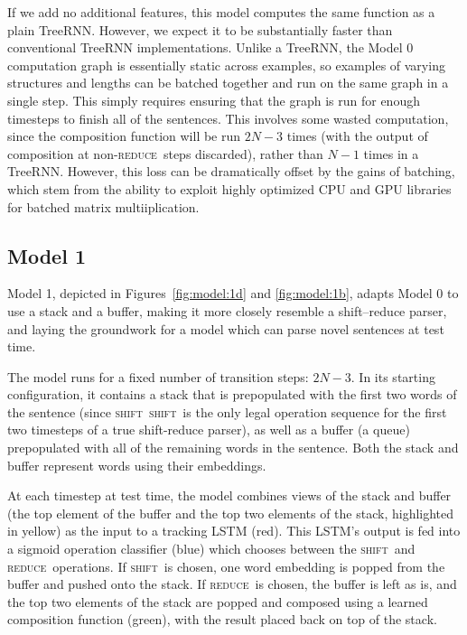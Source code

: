 \documentclass[11pt,letterpaper]{article}
\newcommand{\shift}{\textsc{shift}}
\newcommand{\reduce}{\textsc{reduce}}
\begin{document}
If we add no additional features, this model computes the same function as a plain TreeRNN. However, we expect it to be substantially faster than conventional TreeRNN implementations. Unlike a TreeRNN, the Model 0 computation graph is essentially static across examples, so examples of varying structures and lengths can be batched together and run on the same graph in a single step. This simply requires ensuring that the graph is run for enough timesteps to finish all of the sentences. This involves some wasted computation, since the composition function will be run $2N-3$ times (with the output of composition at non-\reduce~steps discarded), rather than $N-1$ times in a TreeRNN. However, this loss can be dramatically offset by the gains of batching, which stem from the ability to exploit highly optimized CPU and GPU libraries for batched matrix multiiplication.

\subsection{Model 1}



Model 1, depicted in Figures~\ref{fig:model:1d} and \ref{fig:model:1b}, adapts Model 0 to use a stack and a buffer, making it more closely resemble a shift--reduce parser, and laying the groundwork for a model which can parse novel sentences at test time.

The model runs for a fixed number of transition steps: $2N - 3$. In its starting configuration, it contains a stack that is prepopulated with the first two words of the sentence (since \shift~\shift~is the only legal operation sequence for the first two timesteps of a true shift-reduce parser), as well as a buffer (a queue) prepopulated with all of the remaining words in the sentence. Both the stack and buffer represent words using their embeddings. 

At each timestep at test time, the model combines views of the stack and buffer (the top element of the buffer and the top two elements of the stack, highlighted in yellow) as the input to a tracking LSTM (red). This LSTM's output is fed into a sigmoid operation classifier (blue) which chooses between the \shift~and \reduce~operations. If \shift~is chosen, one word embedding is popped from the buffer and pushed onto the stack. If \reduce~is chosen, the buffer is left as is, and the top two elements of the stack are popped and composed using a learned composition function (green), with the result placed back on top of the stack.
\end{document}
